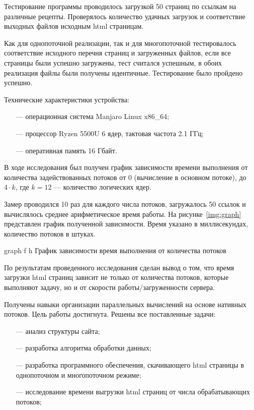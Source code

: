 Тестирование программы проводилось загрузкой 50 страниц по ссылкам на различные рецепты. Проверялось количество удачных загрузок и соответствие выходных файлов исходным html страницам. 

Как для однопоточной реализации, так и для многопоточной тестировалось соответствие исходного перечня страниц и загруженных файлов, если все страницы были успешно загружены, тест считался успешным, в обоих реализация файлы были получены идентичные. Тестирование было пройдено успешно.



Технические характеристики устройства:

\begin{itemize}
	\item[---] операционная система Manjaro Linux x86\_64;
	\item[---] процессор Ryzen 5500U 6 ядер, тактовая частота 2.1 ГГц;
	\item[---] оперативная память 16 Гбайт.
\end{itemize}

В ходе исследования был получен график зависимости времени выполнения от количества задействованных потоков от 0 (вычисление в основном потоке), до $4\cdot k$, где $k = 12$ --- количество логических ядер.

Замер проводился 10 раз для каждого числа потоков, загружалось 50 ссылок и вычислялось среднее арифметическое время работы. На рисунке~\ref{img:graph} представлен график полученной зависимости. Время указано в миллисекундах, количество потоков в штуках.

\FloatBarrier
{}
{graph} %
{f} %
{h} %
{\textwidth} %
{График зависимости время выполнения от количества потоков} %
\FloatBarrier

По результатам проведенного исследования сделан вывод о том, что время загрузки html страниц зависит не только от количества потоков, которые выполняют задачу, но и от скорости работы/загруженности сервера.


Получены навыки организации параллельных вычислений на основе нативных потоков. Цель работы достигнута. Решены все поставленные задачи: 
\begin{itemize}
	\item[---] анализ структуры сайта;
	\item[---] разработка алгоритма обработки данных;
	\item[---] разработка программного обеспечения, скачивающего html страницы в однопоточном и многопоточном режиме;
	\item[---] исследование времени выгрузки html страниц от числа обрабатывающих потоков;
\end{itemize}
